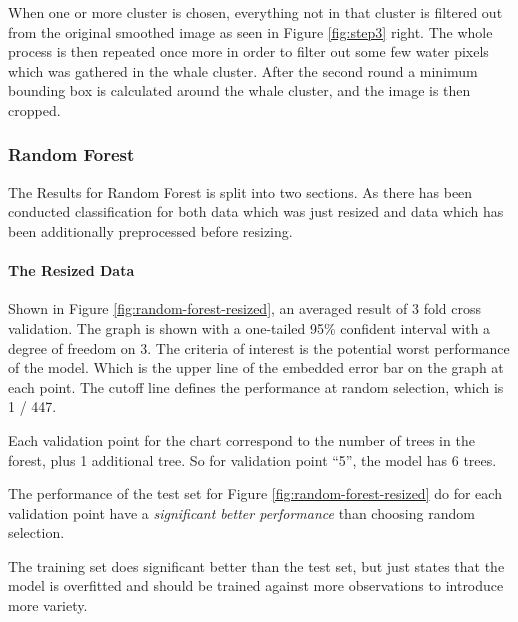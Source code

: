 When one or more cluster is chosen, everything not in that cluster is filtered out from the original smoothed image as seen in Figure \ref{fig:step3} right. The whole process is then repeated once more in order to filter out some few water pixels which was gathered in the whale cluster.
After the second round a minimum bounding box is calculated around the whale cluster, and the image is then cropped.



\subsubsection{Random Forest}
The Results for Random Forest is split into two sections. As there has been conducted classification for both data which was just resized and data which has been additionally preprocessed before resizing.

\paragraph{The Resized Data}
\label{par:rf-resized}
Shown in Figure \ref{fig:random-forest-resized}, an averaged result of 3 fold cross validation. The graph is shown with a one-tailed 95\% confident interval with a degree of freedom on 3. The criteria of interest is the potential worst performance of the model. Which is the upper line of the embedded error bar on the graph at each point. The cutoff line defines the performance at random selection, which is 1 / 447. 

Each validation point for the chart correspond to the number of trees in the forest, plus 1 additional tree. So for validation point ``5'', the model has 6 trees.

The performance of the test set for Figure \ref{fig:random-forest-resized} do for each validation point have a \emph{significant better performance} than choosing random selection.

The training set does significant better than the test set, but just states that the model is overfitted and should be trained against more observations to introduce more variety.

